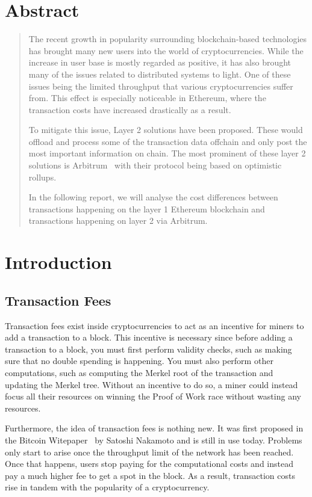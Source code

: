 \documentclass[a4paper,oneside,openright,11pt]{report}
\begin{document}
\chapter*{\centering Abstract}
\begin{quote}\noindent
  The recent growth in popularity surrounding blockchain-based technologies has brought many
  new users into the world of cryptocurrencies. While the increase in user base is mostly regarded 
  as positive, it has also brought many of the issues related to distributed systems to light. One of 
  these issues being the limited throughput that various cryptocurrencies suffer from.
  This effect is especially noticeable in Ethereum, where the transaction costs have
  increased drastically as a result.
  
  To mitigate this issue, Layer 2 solutions have been proposed. These would offload and process
  some of the transaction data offchain and only post the most important information on chain.
  The most prominent of these layer 2 solutions is Arbitrum~\cite{l2Beat} with their protocol 
  being based on optimistic rollups.
  
  In the following report, we will analyse the cost differences between transactions happening on 
  the layer 1 Ethereum blockchain and transactions happening on layer 2 via Arbitrum.
\end{quote}

\tableofcontents


\chapter{Introduction}
\label{ch:intro}

\section{Transaction Fees}
Transaction fees exist inside cryptocurrencies to act as an incentive for miners to add a transaction to a block.
This incentive is necessary since before adding a transaction to a block, you must first perform validity 
checks, such as making sure that no double spending is happening. You must also perform other 
computations, such as computing the Merkel root of the transaction and updating the Merkel tree. 
Without an incentive to do so, a miner could instead focus all their resources on winning the Proof of
Work race without wasting any resources.

Furthermore, the idea of transaction fees is nothing new. It was first proposed in the 
Bitcoin Witepaper~\cite{nakamoto2008bitcoin} by Satoshi Nakamoto and is still in use
today. Problems only start to arise once the throughput limit of the network has been reached. 
Once that happens, users stop paying for the computational costs and instead pay a much higher fee
to get a spot in the block. 
As a result, transaction costs rise in tandem with the popularity of a cryptocurrency.
\end{document}
